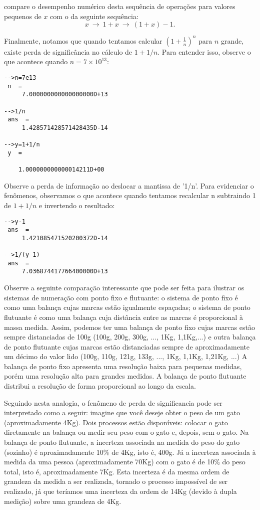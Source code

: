 \begin{ex}
compare o desempenho numérico desta sequência de operações para valores pequenos de $x$ com o da seguinte sequência:
\begin{equation}\label{seq_oper3}x~\longrightarrow~ 1+x ~\longrightarrow~ (1+x)-1 .\end{equation}

Finalmente, notamos que quando tentamos calcular $\left(1+\frac{1}{n}\right)^n$ para $n$ grande, existe perda de significância no cálculo de $1+1/n$. Para entender isso, observe o que acontece quando $n=7\times 10^{13}$:
\begin{verbatim}
-->n=7e13
 n  =
     7.000000000000000000D+13  
 
-->1/n
 ans  =
     1.428571428571428435D-14  
 
-->y=1+1/n
 y  =
 
    1.000000000000014211D+00  
\end{verbatim}
Observe a perda de informação ao deslocar a mantissa de '1/n'. Para evidenciar o fenômenos, observamos o que acontece quando tentamos recalcular n subtraindo 1 de $1+1/n$ e invertendo o resultado:
\begin{verbatim}
-->y-1
 ans  =
     1.421085471520200372D-14  
 
-->1/(y-1)
 ans  =
     7.036874417766400000D+13  
\end{verbatim}

\end{ex}

\begin{ex} Observe a seguinte comparação interessante que pode ser feita para ilustrar os sistemas de numeração com ponto fixo e flutuante: o sistema de ponto fixo é como uma balança cujas marcas estão igualmente espaçadas; o sistema de ponto flutuante é como uma balança cuja distância entre as marcas é proporcional à massa medida. Assim, podemos ter uma balança de ponto fixo cujas marcas estão sempre distanciadas de 100g (100g, 200g, 300g, ..., 1Kg, 1,1Kg,...) e outra balança de ponto flutuante cujas marcas estão distanciadas sempre de aproximadamente um décimo do valor lido (100g, 110g, 121g, 133g, ..., 1Kg, 1,1Kg, 1,21Kg, ...) A balança de ponto fixo apresenta uma resolução baixa para pequenas medidas, porém uma resolução alta para grandes medidas. A balança de ponto flutuante distribui a resolução de forma proporcional ao longo da escala.    

Seguindo nesta analogia, o fenômeno de perda de significancia pode ser interpretado como a seguir: imagine que você deseje obter o peso de um gato (aproximadamente 4Kg). Dois processos estão disponíveis: colocar o gato diretamente na balança ou medir seu peso com o gato e, depois, sem o gato. Na balança de ponto flutuante, a incerteza associada na medida do peso do gato (sozinho) é aproximadamente 10\% de 4Kg, isto é, 400g. Já a incerteza associada à medida da uma pessoa (aproximadamente 70Kg) com o gato é de 10\% do peso total, isto é, aproximadamente 7Kg. Esta incerteza é da mesma ordem de grandeza da medida a ser realizada, tornado o processo impossível de ser realizado, já que teríamos uma incerteza da ordem de 14Kg (devido à dupla medição) sobre uma grandeza de 4Kg.    
\end{ex}